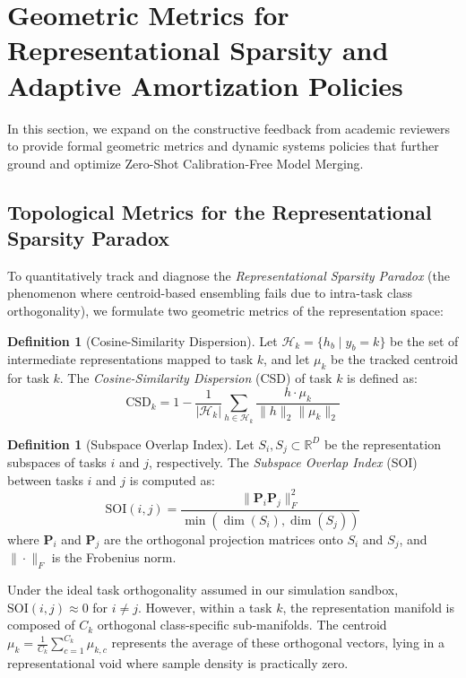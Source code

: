 \documentclass{article}
\theoremstyle{plain}
\theoremstyle{definition}
\newtheorem{definition}[theorem]{Definition}
\theoremstyle{remark}
\begin{document}
\section{Geometric Metrics for Representational Sparsity and Adaptive Amortization Policies}
\label{app:geometric_adaptive}

In this section, we expand on the constructive feedback from academic reviewers to provide formal geometric metrics and dynamic systems policies that further ground and optimize Zero-Shot Calibration-Free Model Merging.

\subsection{Topological Metrics for the Representational Sparsity Paradox}
To quantitatively track and diagnose the \emph{Representational Sparsity Paradox} (the phenomenon where centroid-based ensembling fails due to intra-task class orthogonality), we formulate two geometric metrics of the representation space:

\begin{definition}[Cosine-Similarity Dispersion]
Let $\mathcal{H}_k = \{h_b \mid \hat{y}_b = k\}$ be the set of intermediate representations mapped to task $k$, and let $\mu_k$ be the tracked centroid for task $k$. The \emph{Cosine-Similarity Dispersion} (CSD) of task $k$ is defined as:
\begin{equation}
\text{CSD}_k = 1 - \frac{1}{|\mathcal{H}_k|} \sum_{h \in \mathcal{H}_k} \frac{h \cdot \mu_k}{\|h\|_2 \|\mu_k\|_2}
\end{equation}
\end{definition}

\begin{definition}[Subspace Overlap Index]
Let $S_i, S_j \subset \mathbb{R}^D$ be the representation subspaces of tasks $i$ and $j$, respectively. The \emph{Subspace Overlap Index} (SOI) between tasks $i$ and $j$ is computed as:
\begin{equation}
\text{SOI}(i, j) = \frac{\|\mathbf{P}_i \mathbf{P}_j\|_F^2}{\min(\dim(S_i), \dim(S_j))}
\end{equation}
where $\mathbf{P}_i$ and $\mathbf{P}_j$ are the orthogonal projection matrices onto $S_i$ and $S_j$, and $\|\cdot\|_F$ is the Frobenius norm.
\end{definition}

Under the ideal task orthogonality assumed in our simulation sandbox, $\text{SOI}(i, j) \approx 0$ for $i \neq j$. However, within a task $k$, the representation manifold is composed of $C_k$ orthogonal class-specific sub-manifolds. The centroid $\mu_k = \frac{1}{C_k} \sum_{c=1}^{C_k} \mu_{k, c}$ represents the average of these orthogonal vectors, lying in a representational void where sample density is practically zero. 
\end{document}
